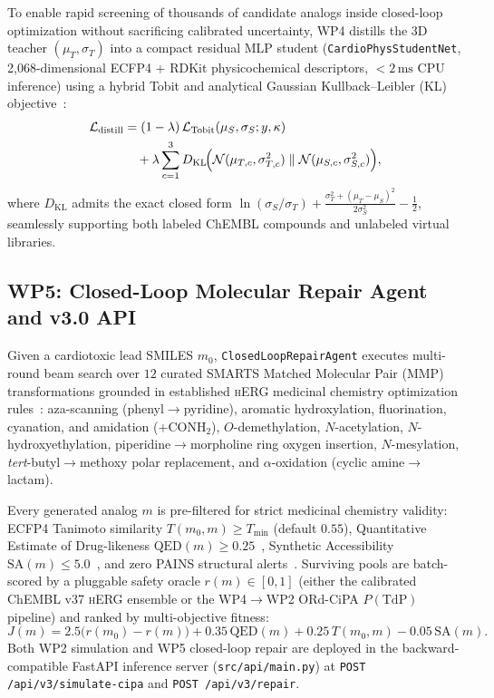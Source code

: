 \documentclass[10pt,twocolumn,letterpaper]{article}
\begin{document}
To enable rapid screening of thousands of candidate analogs inside closed-loop optimization without sacrificing calibrated uncertainty, WP4 distills the 3D teacher $(\mu_T, \sigma_T)$ into a compact residual MLP student (\texttt{CardioPhysStudentNet}, 2,068-dimensional ECFP4 + RDKit physicochemical descriptors, $<2\,\mathrm{ms}$ CPU inference) using a hybrid Tobit and analytical Gaussian Kullback--Leibler (KL) objective~\cite{hinton2015distilling}:
\begin{align}
  \mathcal{L}_{\mathrm{distill}} &= (1 - \lambda)\,\mathcal{L}_{\mathrm{Tobit}}(\mu_S, \sigma_S; y, \kappa) \nonumber\\
  &\quad + \lambda \sum_{c=1}^{3} D_{\mathrm{KL}}\!\Bigl(\mathcal{N}(\mu_{T,c}, \sigma_{T,c}^2) \;\|\; \mathcal{N}(\mu_{S,c}, \sigma_{S,c}^2)\Bigr),
  \label{eq:distill}
\end{align}
where $D_{\mathrm{KL}}$ admits the exact closed form $\ln(\sigma_S/\sigma_T) + \frac{\sigma_T^2 + (\mu_T - \mu_S)^2}{2\sigma_S^2} - \frac{1}{2}$, seamlessly supporting both labeled ChEMBL compounds and unlabeled virtual libraries.

\subsection{WP5: Closed-Loop Molecular Repair Agent and v3.0 API}
\label{sec:wp5}

Given a cardiotoxic lead SMILES $m_0$, \texttt{ClosedLoopRepairAgent} executes multi-round beam search over $12$ curated SMARTS Matched Molecular Pair (MMP) transformations grounded in established \textsc{hERG} medicinal chemistry optimization rules~\cite{jamieson2006medicinal}: aza-scanning (phenyl$\to$pyridine), aromatic hydroxylation, fluorination, cyanation, and amidation ($+\mathrm{CONH}_2$), $O$-demethylation, $N$-acetylation, $N$-hydroxyethylation, piperidine$\to$morpholine ring oxygen insertion, $N$-mesylation, \textit{tert}-butyl$\to$methoxy polar replacement, and $\alpha$-oxidation (cyclic amine$\to$lactam).

Every generated analog $m$ is pre-filtered for strict medicinal chemistry validity: ECFP4 Tanimoto similarity $T(m_0, m) \ge T_{\min}$ (default $0.55$), Quantitative Estimate of Drug-likeness $\mathrm{QED}(m) \ge 0.25$~\cite{bickerton2012quantifying}, Synthetic Accessibility $\mathrm{SA}(m) \le 5.0$~\cite{ertl2009estimation}, and zero PAINS structural alerts~\cite{baell2010new}. Surviving pools are batch-scored by a pluggable safety oracle $r(m) \in [0, 1]$ (either the calibrated ChEMBL v37 \textsc{hERG} ensemble or the WP4$\to$WP2 ORd-CiPA $P(\mathrm{TdP})$ pipeline) and ranked by multi-objective fitness:
\begin{equation}
  J(m) = 2.5\bigl(r(m_0) - r(m)\bigr) + 0.35\,\mathrm{QED}(m) + 0.25\,T(m_0, m) - 0.05\,\mathrm{SA}(m).
  \label{eq:repair_obj}
\end{equation}
Both WP2 simulation and WP5 closed-loop repair are deployed in the backward-compatible FastAPI inference server (\texttt{src/api/main.py}) at \texttt{POST /api/v3/simulate-cipa} and \texttt{POST /api/v3/repair}.
\end{document}
